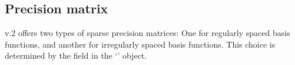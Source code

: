 \documentclass[article]{jss}
\newcommand{\class}[1]{`\code{#1}'}
\def\mbf#1{{%
\mathchoice%
{\hbox{\boldmath$\displaystyle{#1}$}}%
{\hbox{\boldmath$\textstyle{#1}$}}%
{\hbox{\boldmath$\scriptstyle{#1}$}}%
{\hbox{\boldmath$\scriptscriptstyle{#1}$}}%
}}
\def\vec{\mbf}
\begin{document}
\begin{appendix}


\subsection{Precision matrix}

 v.2 offers two types of sparse precision matrices: One for regularly spaced basis functions, and another for irregularly spaced basis functions. 
 This choice is determined by the field  in the \class{Basis} object.


\end{appendix}
\end{document}
